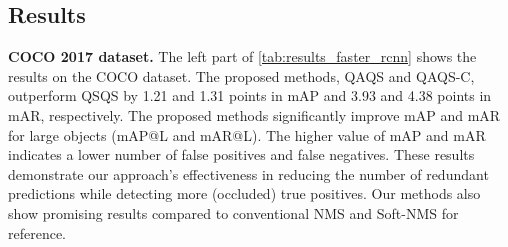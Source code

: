 \subsection{Results}

\noindent\textbf{COCO 2017 dataset. }
The left part of \cref{tab:results_faster_rcnn} shows the results on the COCO dataset. The proposed methods, QAQS and QAQS-C, outperform QSQS by 1.21 and 1.31 points in mAP and 3.93 and 4.38 points in mAR, respectively.
The proposed methods significantly improve mAP and mAR for large objects (mAP@L and mAR@L).
The higher value of mAP and mAR indicates a lower number of false positives and false negatives. These results demonstrate our approach's effectiveness in reducing the number of redundant predictions while detecting more (occluded) true positives. Our methods also show promising results compared to conventional NMS and Soft-NMS for reference.
\setlength\tabcolsep{0.75mm} 
